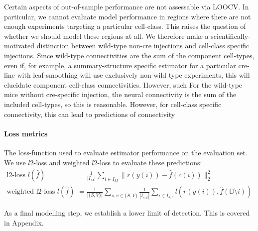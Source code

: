 Certain aspects of out-of-sample performance are not assessable via LOOCV.  
In particular, we cannot evaluate model performance in regions where there are not enough experiments targeting a particular cell-class.
This raises the question of whether we should model these regions at all.
We therefore make a scientifically-motivated distinction between wild-type non-cre injections and cell-class specific injections.
Since wild-type connectivities are the sum of the component cell-types, even if, for example, a summary-structure specific estimator for a particular cre-line with leaf-smoothing will use exclusively non-wild type experiments, this will elucidate component cell-class connectivities.
However, such 
For the wild-type mice without cre-specific injection, the neural connectivity is the sum of the included cell-types, so this is reasonable.
However, for cell-class specific connectivity, this can lead to predictions of connectivity 

\paragraph{Loss metrics}

The loss-function used to evaluate estimator performance on the evaluation set. 
We use $l2$-loss and weighted $l2$-loss to evaluate these predictions:
\begin{align*}
\text{l2-loss } l ( \hat f) &= \frac{1}{|I_M|} \sum_{i \in I_M} \| r(y(i)) - \hat f(c(i)) \|_2^2 \\
\text{weighted l2-loss } l ( \hat f) &= \frac{1}{|\{S,V\}|} \sum_{s,v \in \{S,V\}} \frac{1}{ |I_{s,v}|} \sum_{i \in I_{s,v} } l(r(y(i)), \hat f(\mathbb D \setminus i)) 
\end{align*}

As a final modelling step, we establish a lower limit of detection.
This is covered in Appendix.


